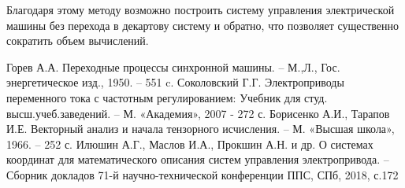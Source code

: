 Благодаря этому методу возможно построить систему управления электрической машины без перехода в декартову систему и обратно, что позволяет существенно сократить объем вычислений.
\begin{thebibliography}{4}
       Горев А.А. Переходные процессы синхронной машины. -- М.,Л., Гос. энергетическое изд., 1950. -- 551 c.
        Соколовский Г.Г. Электроприводы переменного тока с частотным регулированием: Учебник для студ. высш.учеб.заведений.
                -- М. «Академия», 2007 - 272 с.
	Борисенко А.И., Тарапов И.Е. Векторный анализ и начала тензорного исчисления. -- М. «Высшая школа», 1966. -- 252 с.
	Илюшин А.Г., Маслов И.А., Прокшин А.Н. и др. О системах координат для математического описания систем управления электропривода. --
		Сборник докладов 71-й научно-технической конференции ППС, СПб, 2018, с.172
\end{thebibliography}

